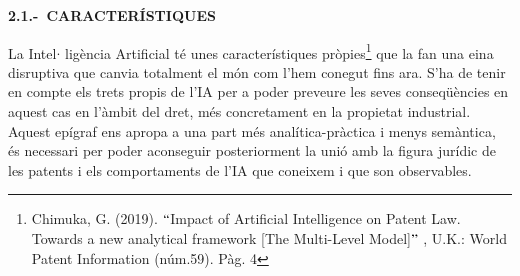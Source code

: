 \documentclass[12pt]{article}
\begin{document}
\vspace{\baselineskip}
\begin{justify}
\textbf{2.1.-\  CARACTERÍSTIQUES}
\end{justify}\par


\vspace{\baselineskip}
\begin{justify}
La Intel$ \cdot $ ligència Artificial té unes característiques pròpies\footnote{ Chimuka, G. (2019). $``$Impact of Artificial Intelligence on Patent Law. Towards a new analytical framework [The Multi-Level Model]$"$ , U.K.: World Patent Information (núm.59). Pàg. 4 } que la fan una eina disruptiva que canvia totalment el món com l’hem conegut fins ara. S’ha de tenir en compte els trets propis de l’IA per a poder preveure les seves conseqüències en aquest cas en l’àmbit del dret, més concretament en la propietat industrial. Aquest epígraf ens apropa a una part més analítica-pràctica i menys semàntica, és necessari per poder aconseguir posteriorment la unió amb la figura jurídic de les patents i els comportaments de l’IA que coneixem i que son observables. 
\end{justify}\par
\end{document}
